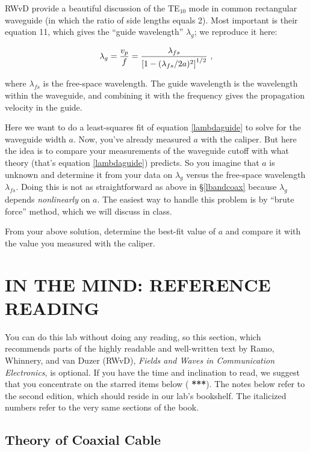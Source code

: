 \documentclass[12pt,preprint]{aastex}
\begin{document}
	RWvD provide a beautiful discussion of the TE$_{10}$ mode in
common rectangular waveguide (in which the ratio of side lengths equals
2).  Most important is their equation 11, which gives the ``guide
wavelength'' $\lambda_g$; we reproduce it here:

\begin{equation} \label{lambdaguide}
\lambda_g = {v_p \over f} = {\lambda_{fs} \over \left[ 1 - (\lambda_{fs}/2a)^2
\right]^{1/2} } \ ,
\end{equation}

\noindent where $\lambda_{fs}$ is the free-space wavelength.  The guide
wavelength is the wavelength within the waveguide, and combining it with
the frequency gives the propagation velocity in the guide. 

Here we want to do a least-squares fit of equation \ref{lambdaguide} to
solve for the waveguide width $a$. Now, you've already measured $a$ with
the caliper. But here the idea is to compare your measurements of the
waveguide cutoff with what theory (that's equation \ref{lambdaguide})
predicts. So you imagine that $a$ is unknown and determine it from your
data on $\lambda_g$ versus the free-space wavelength $\lambda_{fs}$.
Doing this is not as straightforward as above in \S \ref{lbandcoax}
because $\lambda_g$ depends {\it nonlinearly} on $a$. The easiest way to
handle
this problem is by ``brute force'' method, which we will discuss in
class. 

	From your above solution, determine the best-fit value of $a$
and compare it with the value you measured with the caliper.

\section {IN THE MIND: REFERENCE READING} \label{RWvD}

You can do this lab without doing any reading, so this section, which
recommends parts of the highly readable and well-written text by Ramo,
Whinnery, and van Duzer (RWvD), {\it Fields and Waves in Communication
  Electronics}, is optional. If you have the time and inclination to
read, we suggest that you concentrate on the starred items below ({\bf
  ***}).  The notes below refer to the second edition, which should
reside in our lab's bookshelf. The italicized numbers refer to the very
same sections of the book.

\subsection{ Theory of Coaxial Cable}
	
\end{document}
